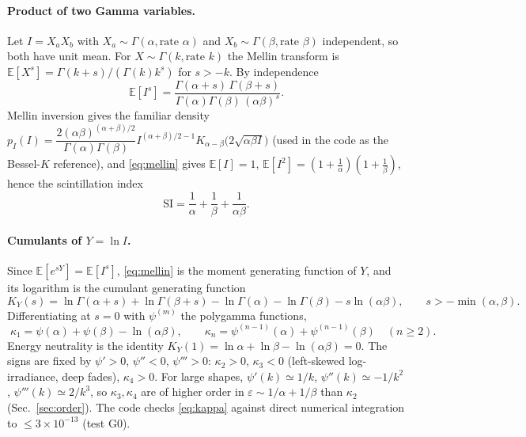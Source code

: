 \documentclass[11pt,a4paper]{article}
\theoremstyle{plain}
\theoremstyle{remark}
\begin{document}
\paragraph{Product of two Gamma variables.}
Let $I=X_aX_b$ with $X_a\sim\Gamma(\alpha,\text{rate }\alpha)$ and $X_b\sim\Gamma(\beta,\text{rate }\beta)$ independent, so both have unit mean. For $X\sim\Gamma(k,\text{rate }k)$ the Mellin transform is
$\mathbb E[X^{s}]=\Gamma(k+s)/(\Gamma(k)k^{s})$ for $s>-k$. By independence
\begin{equation}
  \mathbb E[I^{s}]=\frac{\Gamma(\alpha+s)\,\Gamma(\beta+s)}{\Gamma(\alpha)\Gamma(\beta)\,(\alpha\beta)^{s}} .
  \label{eq:mellin}
\end{equation}
Mellin inversion gives the familiar density
$p_I(I)=\dfrac{2(\alpha\beta)^{(\alpha+\beta)/2}}{\Gamma(\alpha)\Gamma(\beta)}I^{(\alpha+\beta)/2-1}K_{\alpha-\beta}\!\big(2\sqrt{\alpha\beta I}\big)$
(used in the code as the Bessel-$K$ reference), and \eqref{eq:mellin} gives $\mathbb E[I]=1$, $\mathbb E[I^2]=(1+\tfrac1\alpha)(1+\tfrac1\beta)$, hence the scintillation index
\begin{equation}
  \mathrm{SI}=\frac1\alpha+\frac1\beta+\frac1{\alpha\beta}.
\end{equation}

\paragraph{Cumulants of $Y=\ln I$.}
Since $\mathbb E[e^{sY}]=\mathbb E[I^s]$, \eqref{eq:mellin} is the moment generating function of $Y$, and its logarithm is the cumulant generating function
\begin{equation}
  K_Y(s)=\ln\Gamma(\alpha+s)+\ln\Gamma(\beta+s)-\ln\Gamma(\alpha)-\ln\Gamma(\beta)-s\ln(\alpha\beta),
  \qquad s>-\min(\alpha,\beta).
\end{equation}
Differentiating at $s=0$ with $\psi^{(m)}$ the polygamma functions,
\begin{equation}
  \boxed{\;\kappa_1=\psi(\alpha)+\psi(\beta)-\ln(\alpha\beta),\qquad
  \kappa_n=\psi^{(n-1)}(\alpha)+\psi^{(n-1)}(\beta)\quad(n\ge2).\;}
  \label{eq:kappa}
\end{equation}
Energy neutrality is the identity $K_Y(1)=\ln\alpha+\ln\beta-\ln(\alpha\beta)=0$. The signs are fixed by $\psi'>0$, $\psi''<0$, $\psi'''>0$: $\kappa_2>0$, $\kappa_3<0$ (left-skewed log-irradiance, deep fades), $\kappa_4>0$. For large shapes, $\psi'(k)\simeq1/k$, $\psi''(k)\simeq-1/k^2$, $\psi'''(k)\simeq2/k^3$, so $\kappa_3,\kappa_4$ are of higher order in $\varepsilon\sim1/\alpha+1/\beta$ than $\kappa_2$ (Sec.~\ref{sec:order}). The code checks \eqref{eq:kappa} against direct numerical integration to $\le3\times10^{-13}$ (test G0).
\end{document}
